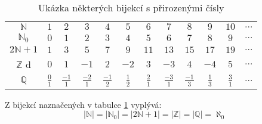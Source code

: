 \begin{table}[h]
    \centering
    \begin{tabular}{cccccccccccc}
    $\mathbb{N}$   & $1$ & $2$ & $3$  & $4$ & $5$  & $6$  & $7$  & $8$  & $9$  & $10$ & $\dots$ \\
    $\mathbb{N}_0$ & $0$ & $1$ & $2$  & $3$ & $4$  & $5$  & $6$  & $7$  & $8$  & $9$  & $\dots$ \\
    $2\mathbb{N}+1$   & $1$ & $3$ & $5$  & $7$ & $9$  & $11$ & $13$ & $15$ & $17$ & $19$ & $\dots$ \\
    $\mathbb{Z}$  d & $0$ & $1$ & $-1$ & $2$ & $-2$ & $3$  & $-3$ & $4$  & $-4$ & $5$  & $\dots$ \\
    $\mathbb{Q}$ &
      $\frac{0}{1}$ &
      $\frac{-1}{1}$ &
      $\frac{-2}{1}$ &
      $\frac{-1}{2}$ &
      $\frac{1}{2}$ &
      $\frac{2}{1}$ &
      $\frac{-3}{1}$ &
      $\frac{-1}{3}$ &
      $\frac{1}{3}$ &
      $\frac{3}{1}$ &
      $\dots$
    \end{tabular}
    \caption{Ukázka některých bijekcí s přirozenými čísly}
    \label{tab:Naturlas_bijection}
\end{table}

Z bijekcí naznačených v tabulce \ref{tab:Naturlas_bijection} vyplývá:
$$|\mathbb{N}| = |\mathbb{N}_0| = |2\mathbb{N}+1| = |\mathbb{Z}| = |\mathbb{Q}| = \aleph_0$$


